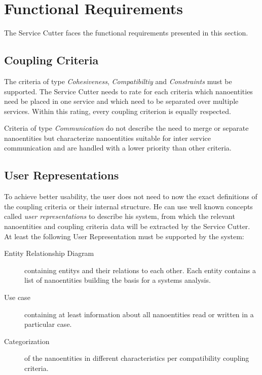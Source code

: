 \section{Functional Requirements}
\label{sec:functionalRequirements}

The Service Cutter faces the functional requirements presented in this
section.


\subsection{Coupling Criteria}

The criteria of type \textit{Cohesiveness}, \textit{Compatibiltiy} and \textit{Constraints} must be supported. The Service Cutter needs to rate for each criteria which nanoentities need be placed in one service and which need to be separated over multiple services. Within this rating, every coupling criterion is equally respected.

Criteria of type \textit{Communication} do not describe the need to merge or separate nanoentities but characterize nanoentities suitable for inter service communication and are handled with a lower priority than other criteria. 

\subsection{User Representations}

To achieve better usability, the user does not need to now the exact definitions of the coupling criteria or their internal structure. He can use well known concepts called \textit{user representations} to describe his system, from which the relevant nanoentities and coupling criteria data will be extracted by the Service Cutter. At least the following User Representation must be supported by the system:

\begin{description}
	\item[Entity Relationship Diagram] containing \glspl{entity} and their relations to each other. Each entity contains a list of nanoentities building the basis for a systems analysis.
	\item[Use case] containing at least information about all nanoentities read or written in a particular case. 
	\item[Categorization] of the nanoentities in different characteristics per compatibility coupling criteria. 
\end{description}


